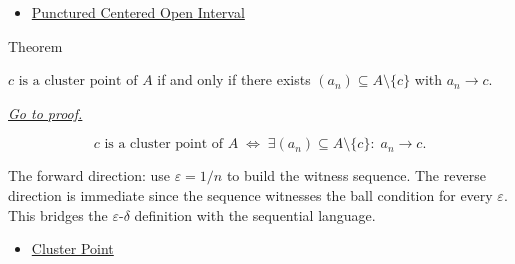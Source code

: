 \begin{dependencies}
\begin{itemize}
  \item \hyperref[def:deleted-epsilon-neighbourhood]{Punctured Centered Open Interval}
\end{itemize}
\end{dependencies}


\begin{theorembox}{Theorem}
\begin{theorem}
\label{thm:cluster-point-sequential}
$c\text{ is a cluster point of }A$ if and only if there exists
$(a_n) \subseteq A \setminus \{c\}$ with $a_n \to c$.

\smallskip\noindent
\hyperref[prf:cluster-point-sequential]{\textit{Go to proof.}}
\end{theorem}
\end{theorembox}

\begin{remark*}
\[
  c\text{ is a cluster point of }A
  \;\iff\;
  \exists (a_n) \subseteq A \setminus \{c\} :\;
  a_n\to c.
\]
\end{remark*}

\begin{remark*}[Interpretation]
The forward direction: use $\varepsilon = 1/n$ to build the witness
sequence. The reverse direction is immediate since the sequence
witnesses the ball condition for every $\varepsilon$. This bridges
the $\varepsilon$-$\delta$ definition with the sequential language.
\end{remark*}

\begin{dependencies}
\begin{itemize}
  \item \hyperref[def:cluster-point-r]{Cluster Point}
\end{itemize}
\end{dependencies}


